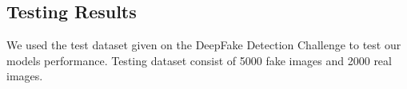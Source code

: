 	\subsection*{Testing Results}
	We used the test dataset given on the DeepFake Detection Challenge\cite{jimaging8100263} to test our models performance.
	Testing dataset consist of 5000 fake images and 2000 real images.
	\vspace{1pt}
	\begin{figure}[ht]
	\end{figure}

